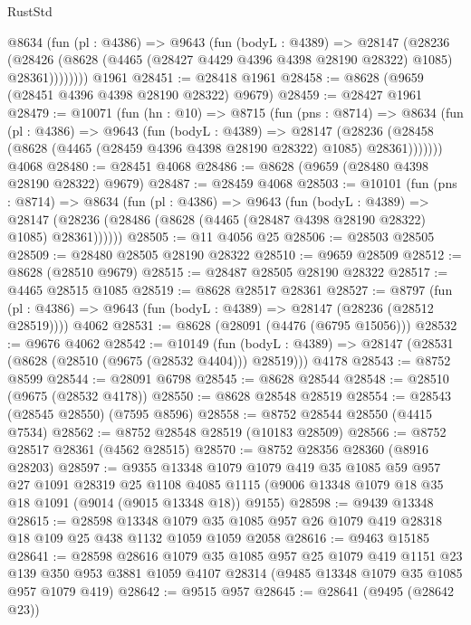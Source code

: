 \begin{lexlean}{RustStd}
\begin{coremodule}
        @8634
          (fun (pl : @4386) =>
          @9643
            (fun (bodyL : @4389) =>
            @28147
              (@28236
                (@28426 (@8628 (@4465 (@28427 @4429 @4396 @4398 @28190 @28322) @1085) @28361))))))))
    @1961
@28451 := @28418 @1961
@28458 := @8628 (@9659 (@28451 @4396 @4398 @28190 @28322) @9679)
@28459 := @28427 @1961
@28479 := @10071
    (fun (hn : @10) =>
    @8715
      (fun (pns : @8714) =>
      @8634
        (fun (pl : @4386) =>
        @9643
          (fun (bodyL : @4389) =>
          @28147
            (@28236 (@28458 (@8628 (@4465 (@28459 @4396 @4398 @28190 @28322) @1085) @28361)))))))
    @4068
@28480 := @28451 @4068
@28486 := @8628 (@9659 (@28480 @4398 @28190 @28322) @9679)
@28487 := @28459 @4068
@28503 := @10101
    (fun (pns : @8714) =>
    @8634
      (fun (pl : @4386) =>
      @9643
        (fun (bodyL : @4389) =>
        @28147 (@28236 (@28486 (@8628 (@4465 (@28487 @4398 @28190 @28322) @1085) @28361))))))
@28505 := @11 @4056 @25
@28506 := @28503 @28505
@28509 := @28480 @28505 @28190 @28322
@28510 := @9659 @28509
@28512 := @8628 (@28510 @9679)
@28515 := @28487 @28505 @28190 @28322
@28517 := @4465 @28515 @1085
@28519 := @8628 @28517 @28361
@28527 := @8797
    (fun (pl : @4386) => @9643 (fun (bodyL : @4389) => @28147 (@28236 (@28512 @28519))))
    @4062
@28531 := @8628 (@28091 (@4476 (@6795 @15056)))
@28532 := @9676 @4062
@28542 := @10149
    (fun (bodyL : @4389) => @28147 (@28531 (@8628 (@28510 (@9675 (@28532 @4404))) @28519)))
    @4178
@28543 := @8752 @8599
@28544 := @28091 @6798
@28545 := @8628 @28544
@28548 := @28510 (@9675 (@28532 @4178))
@28550 := @8628 @28548 @28519
@28554 := @28543 (@28545 @28550) (@7595 @8596)
@28558 := @8752 @28544 @28550 (@4415 @7534)
@28562 := @8752 @28548 @28519 (@10183 @28509)
@28566 := @8752 @28517 @28361 (@4562 @28515)
@28570 := @8752 @28356 @28360 (@8916 @28203)
@28597 := @9355
    @13348
    @1079
    @1079
    @419
    @35
    @1085
    @59
    @957
    @27
    @1091
    @28319
    @25
    @1108
    @4085
    @1115
    (@9006 @13348 @1079 @18 @35 @18 @1091 (@9014 (@9015 @13348 @18)) @9155)
@28598 := @9439 @13348
@28615 := @28598
    @13348
    @1079
    @35
    @1085
    @957
    @26
    @1079
    @419
    @28318
    @18
    @109
    @25
    @438
    @1132
    @1059
    @1059
    @2058
@28616 := @9463 @15185
@28641 := @28598
    @28616
    @1079
    @35
    @1085
    @957
    @25
    @1079
    @419
    @1151
    @23
    @139
    @350
    @953
    @3881
    @1059
    @4107
    @28314
    (@9485 @13348 @1079 @35 @1085 @957 @1079 @419)
@28642 := @9515 @957
@28645 := @28641 (@9495 (@28642 @23))

\end{coremodule}
\end{lexlean}
